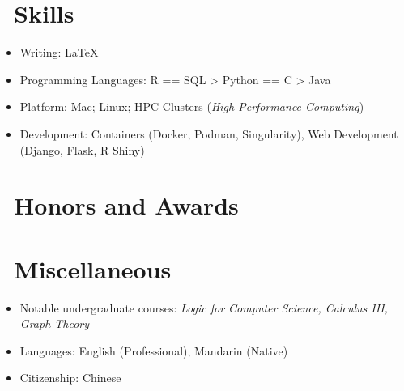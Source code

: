 \documentclass{resume}
\begin{document}

\section{\faCogs\ Skills}
\begin{itemize}[parsep=0.5ex]
  \item Writing: \LaTeX
  \item Programming Languages: R == SQL > Python == C > Java
  \item Platform: Mac; Linux; HPC Clusters (\emph{High Performance Computing}) 
  \item Development: Containers (Docker, Podman, Singularity), Web Development (Django, Flask, R Shiny)
\end{itemize}


\section{\faHeartO\ Honors and Awards}



\section{\faInfo\ Miscellaneous}
\begin{itemize}[parsep=0.5ex]
  \item Notable undergraduate courses:
      \textit{Logic for Computer Science, Calculus III, Graph Theory}
  \item Languages: English (Professional), Mandarin (Native)
  \item Citizenship: Chinese
\end{itemize}



\phantom{}
\end{document}
